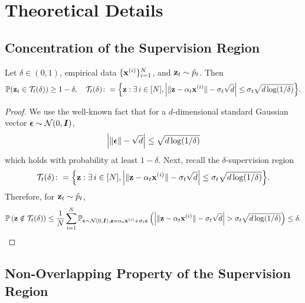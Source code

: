 \section{Theoretical Details} \label{app:theory}

\subsection{Concentration of the Supervision Region} \label{app:theory_concentration}

\renewcommand{\themaster}{3.1} 
\begin{proposition} \label{prop:training_region}
Let $\delta \in (0,1)$, empirical data $\{{\mathbf{x}}^{(i)}\}_{i=1}^{N}$, and ${\mathbf{z}}_t \sim \hat{p}_t$. Then
\begin{equation*}
  \mathbb{P}(\rvz_t \in \mathcal{T}_t(\delta)) \ge 1-\delta,\quad  \mathcal{T}_t(\delta) \colon =\Big\{\rvz : \exists\,i\in [N], \left|\|\rvz - \alpha_t \rvx^{(i)} \| - \sigma_t \sqrt{d} \right| \leq \sigma_t \sqrt{d\log(1/\delta)}\Big\}.
    \vspace{-0.2\baselineskip}
\end{equation*}
\begin{proof}
We use the well-known fact that for a $d$-dimensional standard Gaussian vector ${\boldsymbol{\epsilon}}\sim\mathcal{N}(0,{\bm{I}})$,
\begin{equation*}
    \left|\left\|{\boldsymbol{\epsilon}}\right\|- \sqrt{d}\right|\le \sqrt{d\log(1/\delta)}
\end{equation*}
which holds with probability at least $1-\delta$. Next, recall the $\delta$-supervision region
\begin{equation*}
  \mathcal{T}_t(\delta) \colon =\Big\{{\mathbf{z}} : \exists\,i\in [N], \left|\|{\mathbf{z}} - \alpha_t {\mathbf{x}}^{(i)} \| - \sigma_t \sqrt{d} \right| \leq \sigma_t \sqrt{d\log(1/\delta)}\Big\}.
\end{equation*}
Therefore, for ${\mathbf{z}}_t \sim \hat{p}_t$,
\begin{equation*}
    \mathbb{P}\left({\mathbf{z}}\notin \mathcal{T}_t(\delta)\right) \le \frac{1}{N}\sum_{i=1}^N  \mathbb{P}_{{\boldsymbol{\epsilon}}\sim\mathcal{N}(0,{\bm{I}}),{\mathbf{z}}=\alpha_t {\mathbf{x}}^{(i)}+\sigma_t{\boldsymbol{\epsilon}}}\left(\left|\|{\mathbf{z}} - \alpha_t {\mathbf{x}}^{(i)} \| - \sigma_t \sqrt{d} \right| > \sigma_t \sqrt{d\log(1/\delta)}\right) \le \delta.
\end{equation*}
\end{proof}
\end{proposition}

\subsection{Non-Overlapping Property of the Supervision Region} \label{app:theory_overlap}

